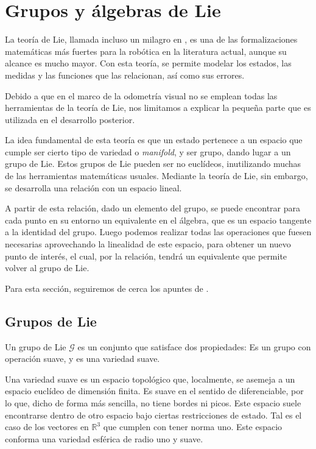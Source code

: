 \section{Grupos y álgebras de Lie}

La teoría de Lie, llamada incluso un milagro en \cite{stillwell2008naive}, es una de las formalizaciones matemáticas más fuertes para la robótica en la literatura actual, aunque su alcance es mucho mayor. Con esta teoría, se permite modelar los estados, las medidas y las funciones que las relacionan, así como sus errores. 

Debido a que en el marco de la odometría visual no se emplean todas las herramientas de la teoría de Lie, nos limitamos a explicar la pequeña parte que es utilizada en el desarrollo posterior.

La idea fundamental de esta teoría es que un estado pertenece a un espacio que cumple ser cierto tipo de variedad o \textit{manifold}, y ser grupo, dando lugar a un grupo de Lie. Estos grupos de Lie pueden ser no euclídeos, inutilizando muchas de las herramientas matemáticas usuales. Mediante la teoría de Lie, sin embargo, se desarrolla una relación con un espacio lineal.

A partir de esta relación, dado un elemento del grupo, se puede encontrar para cada punto en su entorno un equivalente en el álgebra, que es un espacio tangente a la identidad del grupo. Luego podemos realizar todas las operaciones que fuesen necesarias aprovechando la linealidad de este espacio, para obtener un nuevo punto de interés, el cual, por la relación, tendrá un equivalente que permite volver al grupo de Lie. 

Para esta sección, seguiremos de cerca los apuntes de \cite{sola2021microlietheorystate}.


\subsection{Grupos de Lie}

Un grupo de Lie $\mathcal{G}$ es un conjunto que satisface dos propiedades: Es un grupo con operación suave, y es una variedad suave.

Una variedad suave es un espacio topológico que, localmente, se asemeja a un espacio euclídeo de dimensión finita. Es suave en el sentido de diferenciable, por lo que, dicho de forma más sencilla, no tiene bordes ni picos. Este espacio suele encontrarse dentro de otro espacio bajo ciertas restricciones de estado. Tal es el caso de los vectores en $\mathbb{R}^3$ que cumplen con tener norma uno. Este espacio conforma una variedad esférica de radio uno y suave.

